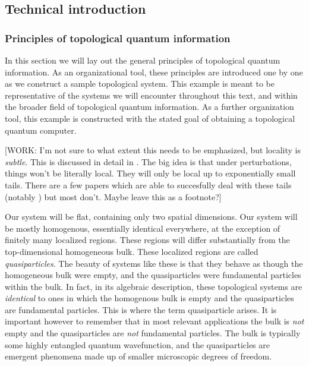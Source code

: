 \subsection{Technical introduction}
\label{technical introduction}

\subsubsection{Principles of topological quantum information}

In this section we will lay out the general principles of topological quantum information. As an organizational tool, these principles are introduced one by one as we construct a sample topological system. This example is meant to be representative of the systems we will encounter throughout this text, and within the broader field of topological quantum information. As a further organization tool, this example is constructed with the stated goal of obtaining a topological quantum computer.

[WORK: I'm not sure to what extent this needs to be emphasized, but locality is \textit{subtle}. This is discussed in detail in \cite{hastings2010locality}. The big idea is that under perturbations, things won't be literally local. They will only be local up to exponentially small tails. There are a few papers which are able to succesfully deal with these tails (notably \cite{ranard2022converse}) but most don't. Maybe leave this as a footnote?]

Our system will be flat, containing only two spatial dimensions. Our system will be mostly homogenous, essentially identical everywhere, at the exception of finitely many localized regions. These regions will differ substantially from the top-dimensional homogeneous bulk. These localized regions are called \textit{quasiparticles}. The beauty of systems like these is that they behave as though the homogeneous bulk were empty, and the quasiparticles were fundamental particles within the bulk. In fact, in its algebraic description, these topological systems are \textit{identical} to ones in which the homogenous bulk is empty and the quasiparticles are fundamental particles. This is where the term quasiparticle arises. It is important however to remember that in most relevant applications the bulk is \textit{not} empty and the quasiparticles are \textit{not} fundamental particles. The bulk is typically some highly entangled quantum wavefunction, and the quasiparticles are emergent phenomena made up of smaller microscopic degrees of freedom.


